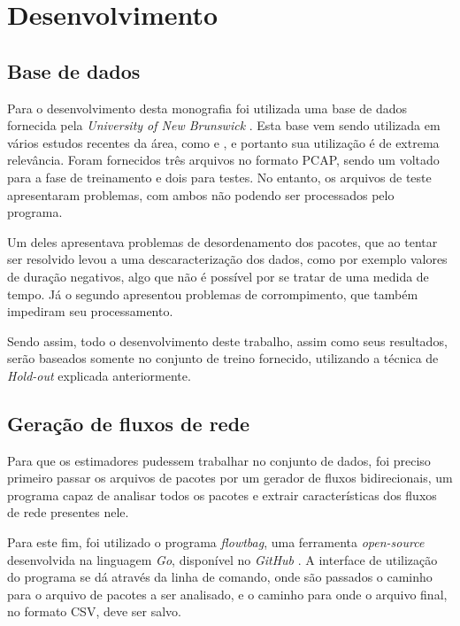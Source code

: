 \chapter{Desenvolvimento}
\label{c.desenvolvimento}

\section{Base de dados}

Para o desenvolvimento desta monografia foi utilizada uma base de dados fornecida pela \textit{University of New Brunswick} \cite{unbdataset}. Esta base vem sendo utilizada em vários estudos recentes da área, como \cite{iscx1} e \cite{rna1}, e portanto sua utilização é de extrema relevância. Foram fornecidos três arquivos no formato PCAP, sendo um voltado para a fase de treinamento e dois para testes. No entanto, os arquivos de teste apresentaram problemas, com ambos não podendo ser processados pelo programa.

Um deles apresentava problemas de desordenamento dos pacotes, que ao tentar ser resolvido levou a uma descaracterização dos dados, como por exemplo valores de duração negativos, algo que não é possível por se tratar de uma medida de tempo. Já o segundo apresentou problemas de corrompimento, que também impediram seu processamento.

Sendo assim, todo o desenvolvimento deste trabalho, assim como seus resultados, serão baseados somente no conjunto de treino fornecido, utilizando a técnica de \textit{Hold-out} explicada anteriormente.

\section{Geração de fluxos de rede}
\label{d.fluxo}

Para que os estimadores pudessem trabalhar no conjunto de dados, foi preciso primeiro passar os arquivos de pacotes por um gerador de fluxos bidirecionais, um programa capaz de analisar todos os pacotes e extrair características dos fluxos de rede presentes nele.

Para este fim, foi utilizado o programa \textit{flowtbag}, uma ferramenta \textit{open-source} desenvolvida na linguagem \textit{Go}, disponível no \textit{GitHub} \cite{flowtbag}. A interface de utilização do programa se dá através da linha de comando, onde são passados o caminho para o arquivo de pacotes a ser analisado, e o caminho para onde o arquivo final, no formato CSV, deve ser salvo.

